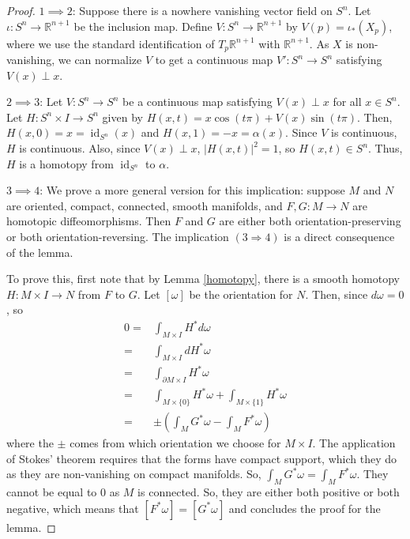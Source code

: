 \documentclass[]{article}
\DeclareMathOperator{\id}{id}
\theoremstyle{definition}
\theoremstyle{definition}
\begin{document}
\begin{proof}
    $1\implies 2$: Suppose there is a nowhere vanishing vector field on $S^n$. Let $\iota:S^n \rightarrow \mathbb{R}^{n+1}$ be the inclusion map. Define $V:S^n \rightarrow \mathbb{R}^{n+1}$ by $V(p)=\iota_*(X_p)$, where we use the standard identification of $T_p\mathbb{R}^{n+1}$ with $\mathbb{R}^{n+1}$. As $X$ is non-vanishing, we can normalize $V$ to get a continuous map $V':S^n \rightarrow S^n$ satisfying $V(x)\perp x$.

    $2\implies 3$: Let $V:S^n \rightarrow S^n$ be a continuous map satisfying $V(x)\perp x$ for all $x\in S^n$. Let $H:S^n\times I\rightarrow S^n$ given by $H(x, t)=x\cos(t\pi)+V(x)\sin(t\pi)$. Then, $H(x, 0)=x=\id_{S^n}(x)$ and $H(x, 1)=-x=\alpha(x)$. Since $V$ is continuous, $H$ is continuous. Also, since $V(x)\perp x$, $|H(x, t)|^2=1$, so $H(x, t)\in S^n$. Thus, $H$ is a homotopy from $\id_{S^n}$ to $\alpha$.

    $3\implies 4$: We prove a more general version for this implication: suppose $M$ and $N$ are oriented, compact, connected, smooth manifolds,
    and $F, G:M \rightarrow N$ are homotopic diffeomorphisms. Then $F$ and $G$
    are either both orientation-preserving or both orientation-reversing. The implication $(3\Rightarrow4)$ is a direct consequence of the lemma.
    
    To prove this, first note that by Lemma \ref{homotopy}, there is a smooth homotopy $H:M\times I \rightarrow N$ from $F$ to $G$. Let $[\omega]$ be the orientation for $N$. Then, since $d\omega=0$, so \begin{align*}
        0=&\int_{M\times I}H^*d\omega\\
        =&\int_{M\times I}dH^*\omega\\
        =&\int_{\partial M\times I}H^*\omega\\
        =&\int_{M\times \{0\}}H^*\omega+\int_{M\times \{1\}}H^*\omega\\
        =&\pm\left(\int_M G^*\omega-\int_M F^*\omega\right)
    \end{align*}
    where the $\pm$ comes from which orientation we choose for $M\times I$. The application of Stokes' theorem requires that the forms have compact support, which they do as they are non-vanishing on compact manifolds. So, $\int_M G^*\omega=\int_M F^*\omega$. They cannot be equal to 0 as $M$ is connected. So, they are either both positive or both negative, which means that $[F^*\omega]=[G^*\omega]$ and concludes the proof for the lemma.


\end{proof}
\end{document}
